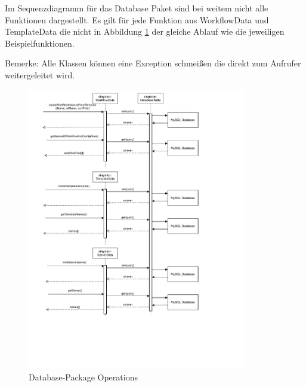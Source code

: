 Im Sequenzdiagramm für das Database Paket sind bei weitem nicht alle Funktionen dargestellt. Es gilt für jede Funktion aus WorkflowData und TemplateData die nicht in Abbildung \ref{fig:databaseSeq} der gleiche Ablauf wie die jeweiligen Beispielfunktionen. 

Bemerke: Alle Klassen können eine Exception schmeißen die direkt zum Aufrufer weitergeleitet wird.


\begin{figure}[H]
	\centering
	\includegraphics[width=0.85\textwidth]{res/Database_Sequence.drawio.pdf} 
	\caption{Database-Package Operations}
	\label{fig:databaseSeq}
\end{figure}